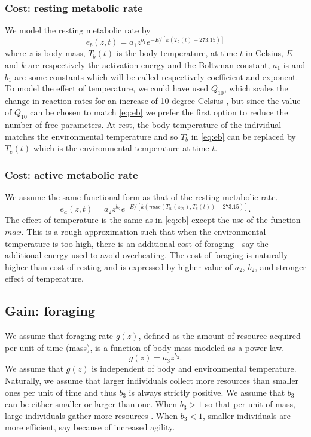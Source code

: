 \subsubsection*{Cost: resting metabolic rate}
We model the resting metabolic rate by
\begin{equation} \label{eq:eb}
	e_b(z, t) = a_1 z^{b_1} e^{-E/[k (T_b(t)+ 273.15)]}
\end{equation}
where $z$ is body mass, $T_b(t)$ is the body temperature, at time $t$ in Celsius, $E$ and $k$ are respectively the activation energy and the Boltzman constant, $a_1$ is and $b_1$ are some constants which will be called respectively coefficient and exponent.
To model the effect of temperature, we could have used $Q_{10}$, which scales the change in reaction rates for an increase of 10 degree Celsius \citep{Precht1973}, but since the value of $Q_{10}$ can be chosen to match \cref{eq:eb} we prefer the first option to reduce the number of free parameters.
At rest, the body temperature of the individual matches the environmental temperature \citep{Bartholomew1978} and so $T_b$ in \cref{eq:eb} can be replaced by $T_e(t)$ which is the environmental temperature at time $t$.

\subsubsection*{Cost: active metabolic rate}
We assume the same functional form as that of the resting metabolic rate.
\begin{equation} \label{eq:ea}
	e_a(z,t) = a_2 z^{b_2}  e^{-E/[k (max(T_w(z_{th}), T_e(t))+ 273.15)]}.
\end{equation}
The effect of temperature is the same as in \cref{eq:eb} except the use of the function $max$.
This is a rough approximation such that when the environmental temperature is too high, there is an additional cost of foraging---say the additional energy used to avoid overheating. 
The cost of foraging is naturally higher than cost of resting and is expressed by higher value of $a_2$, $b_2$, and stronger effect of temperature.

\subsection*{Gain: foraging}
We assume that foraging rate $g(z)$, defined as the amount of resource acquired per unit of time (mass), is a function of body mass modeled as a power law. 
\[
	g(z) = a_3 z^{b_3}.
\] 
We assume that $g(z)$ is independent of body and environmental temperature.
Naturally, we assume that larger individuals collect more resources than smaller ones per unit of time and thus $b_3$  is always strictly positive.
We assume that $b_3$ can be either smaller or larger than one.
When $b_3 > 1$ so that per unit of mass, large individuals gather more resources \citep[e.g.][]{Nervo2014}.
When $b_3 < 1$, smaller individuals are more efficient, say because of increased agility. %

